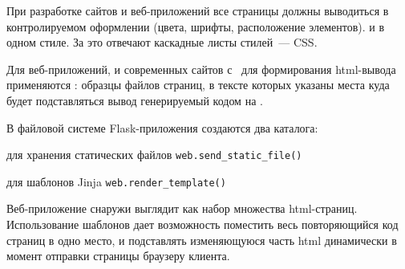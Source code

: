 
При разработке сайтов и веб-приложений все страницы должны выводиться в
контролируемом оформлении (цвета, шрифты, расположение элементов). и в одном
стиле. За это отвечают каскадные листы стилей\ --- CSS.

Для веб-приложений, и современных сайтов с \ для формирования html-вывода
применяются : образцы файлов страниц, в тексте которых указаны
места куда будет подставляться вывод генерируемый кодом на \py.

В файловой системе Flask-приложения создаются два каталога:
\begin{description}[nosep]
\item[static/] для хранения статических файлов
\verb|web.send_static_file()|
\item[templates/] для шаблонов Jinja \verb|web.render_template()|
\end{description}


Веб-приложение снаружи выглядит как набор множества html-страниц. Использование
шаблонов дает возможность поместить весь повторяющийся код страниц в одно место,
и подставлять изменяющуюся часть html динамически в момент отправки страницы
браузеру клиента.

\clearpage
{}

